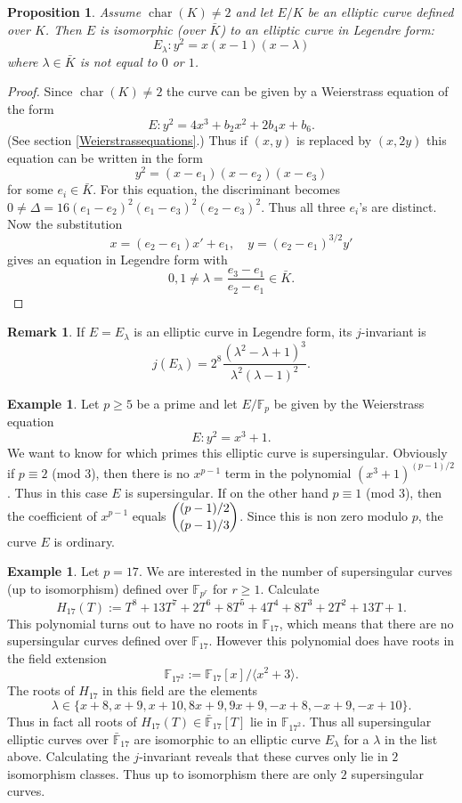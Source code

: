 \documentclass{article}
\numberwithin{equation}{section}
\newtheorem{proposition}[theorem]{Proposition}
\theoremstyle{definition}
\newtheorem{example}[theorem]{Example}
\newtheorem{remark}[theorem]{Remark}
\newcommand{\FF}[1]{{\mathbb F}_{#1}} %
\newcommand{\FFCL}[1]{{\bar {\mathbb F}}_{#1}} %
\newcommand{\grgen}[1]{\langle #1 \rangle} %
\newcommand{\Char}[1]{\operatorname{char} (#1)} %
\begin{document}
\begin{proposition}
Assume $\Char{K} \neq 2$ and let $E/K$ be an elliptic curve defined over $K$. Then $E$ is isomorphic (over $\bar{K}$) to an elliptic curve in Legendre form: $$E_\lambda:y^2=x(x-1)(x-\lambda)$$ where $\lambda \in \bar{K}$ is not equal to $0$ or $1$. 
\end{proposition}

\begin{proof}
Since $\Char{K} \neq 2$ the curve can be given by a Weierstrass equation of the form $$E:y^2=4x^3 +b_2x^2+2b_4x+b_6.$$ (See section \ref{Weierstrassequations}.) Thus if $(x,y)$ is replaced by $(x,2y)$ this equation can be written in the form $$y^2=(x-e_1)(x-e_2)(x-e_3)$$ for some $e_i \in \bar{K}$. For this equation, the discriminant becomes $0 \neq \Delta = 16(e_1-e_2)^2(e_1-e_3)^2(e_2-e_3)^2$. Thus all three $e_i$'s are distinct. Now the substitution $$x=(e_2-e_1)x'+e_1, \quad y=(e_2-e_1)^{3/2}y'$$ gives an equation in Legendre form with $$0,1 \neq \lambda = \frac{e_3-e_1}{e_2-e_1} \in \bar{K}.$$
\end{proof}

\begin{remark}
If $E=E_\lambda$ is an elliptic curve in Legendre form, its $j$-invariant is $$j(E_\lambda)=2^8 \frac{(\lambda^2-\lambda+1)^3}{\lambda^2(\lambda-1)^2}.$$ 
\end{remark}

\begin{example}
Let $p \geq 5$ be a prime and let $E/\FF{p}$ be given by the Weierstrass equation $$E:y^2=x^3+1.$$ We want to know for which primes this elliptic curve is supersingular. Obviously if $p \equiv 2$ (mod $3$), then there is no $x^{p-1}$ term in the polynomial $(x^3+1)^{(p-1)/2}$. Thus in this case $E$ is supersingular. If on the other hand $p \equiv 1$ (mod $3$), then the coefficient of $x^{p-1}$ equals $\dbinom{(p-1)/2}{(p-1)/3}$. Since this is non zero modulo $p$, the curve $E$ is ordinary.
\end{example}

\begin{example}
Let $p=17$. We are interested in the number of supersingular curves (up to isomorphism) defined over $\FF{p^r}$ for $r \geq 1$. Calculate $$H_{17}(T):=T^8+13T^7+2T^6+8T^5+4T^4+8T^3+2T^2+13T+1.$$ This polynomial turns out to have no roots in $\FF{17}$, which means that there are no supersingular curves defined over $\FF{17}$. However this polynomial does have roots in the field extension $$\FF{17^2}:=\FF{17}[x]/\grgen{x^2+3}.$$ The roots of $H_{17}$ in this field are the elements $$\lambda \in \{x+8,x+9,x+10,8x+9,9x+9,-x+8,-x+9,-x+10\}.$$ Thus in fact all roots of $H_{17}(T)\in \FFCL{17}[T]$ lie in $\FF{17^2}$. Thus all supersingular elliptic curves over $\FFCL{17}$ are isomorphic to an elliptic curve $E_\lambda$ for a $\lambda$ in the list above. Calculating the $j$-invariant reveals that these curves only lie in $2$ isomorphism classes. Thus up to isomorphism there are only $2$ supersingular curves.
\end{example}
\end{document}
